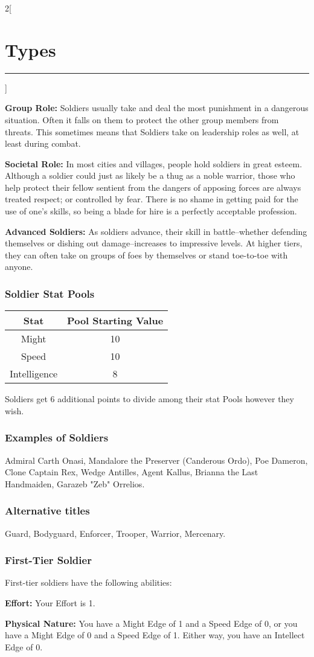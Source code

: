 \documentclass[a4paper,10pt,final]{book}
\newcommand{\HRule}{\rule{\linewidth}{0.5mm}} %
\newcommand{\newSection}[1]{\section*{#1} \addcontentsline{toc}{section}{#1} \label{sec:#1} \HRule}
\newcommand{\statPool}[5]
{
	\subsubsection*{#1 Stat Pools}
	\label{subsub:#1StatPools}
	\begin{center}
	\begin{tabular}{ |c|c| }
	\hline
	\textbf{Stat} & \textbf{Pool Starting Value} \\
	\hline \hline
	Might & #2 \\
	\hline
 	Speed & #3  \\
 	\hline
 	Intelligence & #4  \\
 	\hline
	\end{tabular}
	\end{center}
	#1s get #5 additional points to divide among their stat Pools however they wish.
}
\newcommand{\itemLine}[2]{\textbf{#1:} {#2}\par}
\newenvironment{docsection}[1]
{
  \begin{multicols*}{2}[\newSection{#1}]
}
{
  \end{multicols*}
  \newpage
}
\begin{document}
\begin{docsection}{Types}
\itemLine{Group Role} {Soldiers usually take and deal the most punishment in a dangerous situation. Often it falls on them to protect the other group members from threats. This sometimes means that Soldiers take on leadership roles as well, at least during combat.}

\itemLine{Societal Role} {In most cities and villages, people hold soldiers in great esteem. Although a soldier could just as likely be a thug as a noble warrior, those who help protect their fellow sentient from the dangers of apposing forces are always treated respect; or controlled by fear. There is no shame in getting paid for the use of one’s skills, so being a blade for hire is a perfectly acceptable profession.}

\itemLine{Advanced Soldiers} {As soldiers advance, their skill in battle--whether defending themselves or dishing out damage--increases to impressive levels. At higher tiers, they can often take on groups of foes by themselves or stand toe-to-toe with anyone.}

\statPool{Soldier}{10}{10}{8}{6}

\subsubsection*{Examples of Soldiers}
\label{subsub:soldierExamples}

Admiral Carth Onasi, Mandalore the Preserver (Canderous Ordo), Poe Dameron, Clone Captain Rex, Wedge Antilles, Agent Kallus, Brianna the Last Handmaiden, Garazeb "Zeb" Orrelios.

\subsubsection*{Alternative titles}
\label{subsub:soldierAlternative}

Guard, Bodyguard, Enforcer, Trooper, Warrior, Mercenary.


\subsubsection*{First-Tier Soldier}
\label{subsub:soldierFirstTier}

First-tier soldiers have the following abilities:

\itemLine{Effort} {Your Effort is 1.}

\itemLine{Physical Nature} {You have a Might Edge
of 1 and a Speed Edge of 0, or you have a
Might Edge of 0 and a Speed Edge of 1.
Either way, you have an Intellect Edge of 0.}


\end{docsection}
\end{document}
